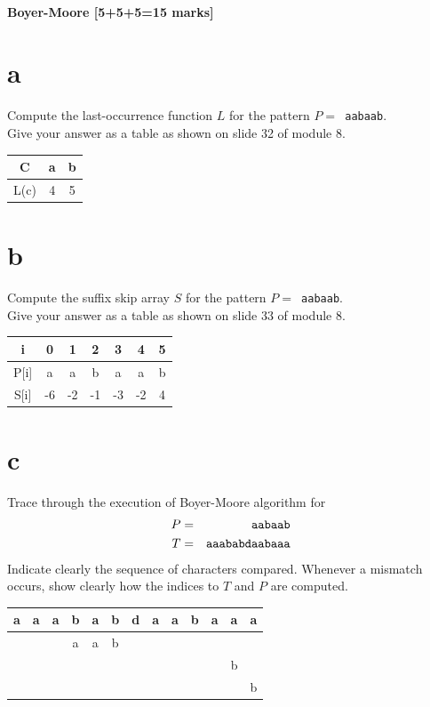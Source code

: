 \documentclass[12pt]{article}
\begin{document}
\subsection{Boyer-Moore [5+5+5=15 marks]}
\begin{itemize}
\part{a}
Compute the last-occurrence function $L$ for the pattern $P =$\texttt{~aabaab}.\\ Give your answer as a table as shown on slide 32 of module 8.
\begin{center}
  \begin{tabular}{c | c | c}
    C & a & b\\
    \hline
    L(c) & 4 & 5\\
  \end{tabular}
\end{center}
\part{b}
Compute the suffix skip array $S$ for the pattern $P =$\texttt{~aabaab}. \\Give your answer as a table as shown on slide 33 of module 8.
\begin{center}
  \begin{tabular}{c|c|c|c|c|c|c}
    i & 0 & 1 & 2 & 3 & 4 & 5\\
    \hline
    P[i] & a & a & b & a & a & b\\
    S[i] & -6 & -2 & -1 & -3 & -2 & 4
  \end{tabular}
\end{center}

\part{c} Trace through the execution of Boyer-Moore algorithm for
\begin{align*}
P &=& \tt{aabaab}\\
T &=& \tt{aaababdaabaaa}
\end{align*}
Indicate clearly the sequence of characters compared. Whenever a mismatch occurs, show clearly how the indices to $T$ and $P$ are computed.
\begin{center}
  \begin{tabular}{|c|c|c|c|c|c|c|c|c|c|c|c|c|}
  \hline
  \textbf{a} &\textbf{a} &\textbf{a} &\textbf{b} &\textbf{a} &\textbf{b} &\textbf{d} &\textbf{a} &\textbf{a} &\textbf{b} &\textbf{a} &\textbf{a} & \textbf{a}\\
  \hline
   &&&a&a&b&&&&&&&\\
  \hline
   &&&&&&&&&&&b&\\
  \hline
   &&&&&&&&&&&&b\\
  \hline
  \end{tabular}
\end{center}
\end{itemize}
\end{document}
